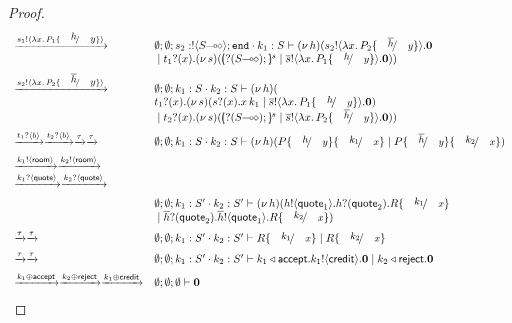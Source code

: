 \begin{proof}
\[\begin{array}{ll}
		\by{\bactout{s_1}{\abs{x}{P_1 \subst{h}{y}}}}&
		\es; \es; s_2: \btout{\lhot{S}} \tinact \cat k_1: S \proves \newsp{h}{\bout{s_2}{\abs{x}{P_2 \subst{\dual{h}}{y}}} \inact\\
		& \Par \binp{t_1}{x} \newsp{s}{\mapchar{\btinp{\lhot{S}}}{s} \Par \bout{\dual{s}}{\abs{x}{P_1 \subst{h}{y}}} \inact }}
\\[2mm]

		\by{\bactout{s_2}{\abs{x}{P_2 \subst{\dual{h}}{y}}}}&
		\es; \es; k_1: S \cat k_2: S \proves \newsp{h}{\\
		& \binp{t_1}{x} \newsp{s}{\binp{s}{x} \appl{x}{k_1} \Par \bout{\dual{s}}{\abs{x}{P_1 \subst{h}{y}}} \inact }\\
		& \Par \binp{t_2}{x} \newsp{s}{\mapchar{\btinp{\lhot{S}}}{s} \Par \bout{\dual{s}}{\abs{x}{P_2 \subst{\dual{h}}{y}}} \inact }}
\\[2mm]

		\by{\bactinp{t_1}{b}} \by{\bactinp{t_2}{b}} \by{\tau}\by{\tau}&
		\es; \es; k_1: S \cat k_2: S \proves \newsp{h}{
		P\subst{h}{y} \subst{k_1}{x} \Par P\subst{\dual{h}}{y} \subst{k_2}{x}}
\\[2mm]

		\by{\bactout{k_1}{\rtype}} \by{\bactout{k_2}{\rtype}}&
\\
		\by{\bactinp{k_1}{\Quote}} \by{\bactinp{k_2}{\Quote}}&
\\[2mm]

		& \es; \es; k_1: S' \cat k_2: S' \proves \newsp{h}{
		\bout{h}{\Quote_1} \binp{h}{\Quote_2} R \subst{k_1}{x} \\
		& \Par \binp{\dual{h}}{\Quote_2} \bout{\dual{h}}{\Quote_1} R \subst{k_2}{x}}
\\[2mm]
		\by{\tau} \by{\tau}&
		\es; \es; k_1: S' \cat k_2: S' \proves R \subst{k_1}{x} \Par R \subst{k_2}{x}
\\[2mm]
		\by{\tau} \by{\tau}&
		\es; \es; k_1: S' \cat k_2: S' \proves
		\bsel{k_1}{\accept} \bout{k_1}{\creditc} \inact 
		\Par \bsel{k_2}{\reject} \inact
\\[2mm]
		\by{\bactsel{k_1}{\accept}} \by{\bactsel{k_2}{\reject}} \by{\bactsel{k_1}{\creditc}}&
		\es; \es; \es \proves \inact
	\end{array}
\]
\end{proof}

